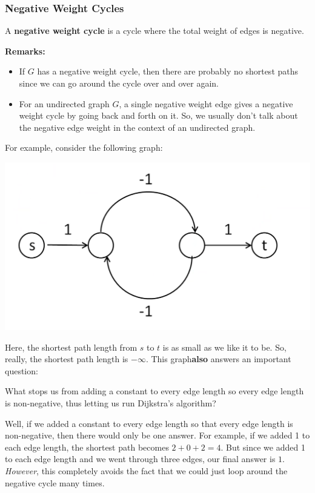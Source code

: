 \documentclass[letterpaper]{article}
\begin{document}
\subsubsection{Negative Weight Cycles}
\begin{definition}{}{}
    A \textbf{negative weight cycle} is a cycle where the total weight of edges is negative. 
\end{definition}
\textbf{Remarks:}
\begin{itemize}
    \item If $G$ has a negative weight cycle, then there are probably no shortest paths since we can go around the cycle over and over again. 
    \item For an undirected graph $G$, a single negative weight edge gives a negative weight cycle by going back and forth on it. So, we usually don't talk about the negative edge weight in the context of an undirected graph. 
\end{itemize}
For example, consider the following graph:
\begin{center}
    \includegraphics[scale=0.2]{assets/neg_cycle_1.png}
\end{center}
Here, the shortest path length from $s$ to $t$ is as small as we like it to be. So, really, the shortest path length is $-\infty$. This graph\textbf{also} answers an important question:
\begin{mdframed}[]
    What stops us from adding a constant to every edge length so every edge length is non-negative, thus letting us run Dijkstra's algorithm? 
\end{mdframed}
Well, if we added a constant to every edge length so that every edge length is non-negative, then there would only be one answer. For example, if we added 1 to each edge length, the shortest path becomes $2 + 0 + 2 = 4$. But since we added 1 to each edge length and we went through three edges, our final answer is $1$. \emph{However}, this completely avoids the fact that we could just loop around the negative cycle many times. 
\end{document}

